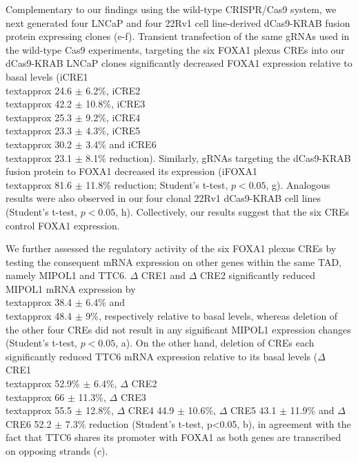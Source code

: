 Complementary to our findings using the wild-type CRISPR/Cas9 system, we next generated four LNCaP and four 22Rv1 cell line-derived dCas9-KRAB fusion protein expressing clones (e-f).
Transient transfection of the same gRNAs used in the wild-type Cas9 experiments, targeting the six FOXA1 plexus CREs into our dCas9-KRAB LNCaP clones significantly decreased FOXA1 expression relative to basal levels (iCRE1 \\textapprox 24.6 $\pm$ 6.2\%, iCRE2 \\textapprox 42.2 $\pm$ 10.8\%, iCRE3 \\textapprox 25.3 $\pm$ 9.2\%, iCRE4 \\textapprox 23.3 $\pm$ 4.3\%, iCRE5 \\textapprox 30.2 $\pm$ 3.4\% and iCRE6 \\textapprox 23.1 $\pm$ 8.1\% reduction).
Similarly, gRNAs targeting the dCas9-KRAB fusion protein to FOXA1 decreased its expression (iFOXA1 \\textapprox 81.6 $\pm$ 11.8\% reduction; Student's t-test, $p<0.05$, g).
Analogous results were also observed in our four clonal 22Rv1 dCas9-KRAB cell lines (Student's t-test, $p<0.05$, h).
Collectively, our results suggest that the six CREs control FOXA1 expression.

We further assessed the regulatory activity of the six FOXA1 plexus CREs by testing the consequent mRNA expression on other genes within the same TAD, namely MIPOL1 and TTC6.
$\Delta$ CRE1 and $\Delta$ CRE2 significantly reduced MIPOL1 mRNA expression by \\textapprox 38.4 $\pm$ 6.4\% and \\textapprox 48.4 $\pm$ 9\%, respectively relative to basal levels, whereas deletion of the other four CREs did not result in any significant MIPOL1 expression changes (Student's t-test, $p<0.05$, a).
On the other hand, deletion of CREs each significantly reduced TTC6 mRNA expression relative to its basal levels ($\Delta$ CRE1 \\textapprox 52.9\% $\pm$ 6.4\%, $\Delta$ CRE2 \\textapprox 66 $\pm$ 11.3\%, $\Delta$ CRE3 \\textapprox 55.5 $\pm$ 12.8\%, $\Delta$ CRE4 44.9 $\pm$ 10.6\%, $\Delta$ CRE5 43.1 $\pm$ 11.9\% and $\Delta$ CRE6 52.2 $\pm$ 7.3\% reduction (Student's t-test, p<0.05, b), in agreement with the fact that TTC6 shares its promoter with FOXA1 as both genes are transcribed on opposing strands (c).

